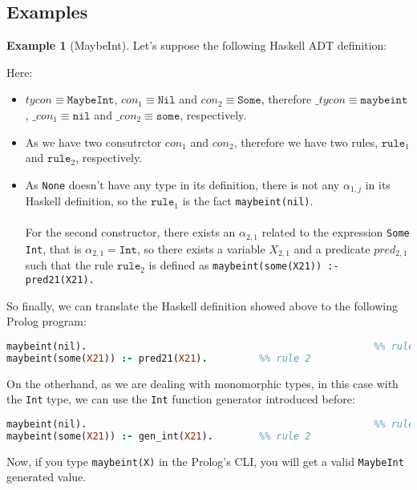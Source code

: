 \documentclass{report}
\theoremstyle{definition}
\newtheorem{example}{Example}[section]
\theoremstyle{definition}
\newcommand{\ttt}[1]{\texttt{#1}}
\begin{document}
\subsection{Examples} \label{ch:monomorphic-types-examples}
\begin{example}[MaybeInt]
	Let's suppose the following Haskell ADT definition:
	
	Here:
	\begin{itemize}
		\item $tycon \equiv \ttt{MaybeInt}$, $con_1 \equiv \ttt{Nil}$ and $con_2 \equiv \ttt{Some}$, therefore $\_tycon \equiv \ttt{maybeint}$, $\_con_1 \equiv \ttt{nil}$ and $\_con_2 \equiv \ttt{some}$, respectively.
		\item As we have two consutrctor $con_1$ and $con_2$, therefore we have two rules, $\ttt{rule}_1$ and $\ttt{rule}_2$, respectively.
		\item As \ttt{None} doesn't have any type in its definition, there is not any $\alpha_{1,j}$ in its Haskell definition, so the $\ttt{rule}_1$ is the fact \ttt{maybeint(nil)}.\\\\
		For the second constructor, there exists an $\alpha_{2,1}$ related to the expression \ttt{Some Int}, that is $\alpha_{2,1} = \ttt{Int}$, so there exists a variable $X_{2,1}$ and a predicate $pred_{2,1}$ such that the rule $\ttt{rule}_2$ is defined as \ttt{maybeint(some(X21)) :- pred21(X21).}
	\end{itemize}
	So finally, we can translate the Haskell definition showed above to the following Prolog program:\\
\begin{lstlisting}[language=Prolog]
maybeint(nil).													%% rule 1
maybeint(some(X21)) :- pred21(X21).			%% rule 2
\end{lstlisting}
On the otherhand, as we are dealing with monomorphic types, in this case with the \ttt{Int} type, we can use the \ttt{Int} function generator introduced before:\\
\begin{lstlisting}[language=Prolog]
maybeint(nil).													%% rule 1
maybeint(some(X21)) :- gen_int(X21).		%% rule 2
\end{lstlisting}
Now, if you type \ttt{maybeint(X)} in the Prolog's CLI, you will get a valid \ttt{MaybeInt} generated value.
\end{example}
\end{document}
